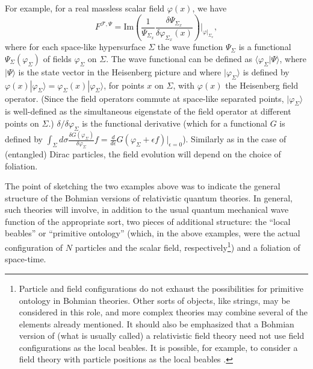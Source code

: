 \documentclass[12pt]{article}
\begin{document}
For example, for a real massless scalar field $\varphi(x)$, we have
\begin{equation}
F^{\mathscr{F},\Psi} = \text{Im} \left( \frac{1}{\Psi_{\Sigma_x}} \frac{\delta \Psi_{\Sigma_x}}{\delta \varphi_{\Sigma_x}(x)} \right)\Big|_{\varphi|_{\Sigma_x}},
\label{f}
\end{equation} 
where for each space-like hypersurface $\Sigma$ the wave function
$\Psi_\Sigma$ is a functional $\Psi_\Sigma(\varphi_\Sigma)$ of fields
$\varphi_\Sigma$ on $\Sigma$. The wave functional can be defined as
$\langle \varphi_\Sigma | \Psi \rangle$, where $|\Psi \rangle$ is the
state vector in the Heisenberg picture and where
$|\varphi_\Sigma\rangle$ is defined by $ \varphi(x)
|\varphi_\Sigma\rangle = \varphi_\Sigma(x) |\varphi_\Sigma\rangle$,
for points $x$ on $\Sigma$, with $\varphi(x)$ the Heisenberg field
operator.  (Since the field operators commute at space-like separated points, $|\varphi_\Sigma\rangle$ is well-defined as the simultaneous eigenstate of the field operator at different points on $\Sigma$.) $\delta /\delta \varphi_\Sigma$ is the functional derivative (which for a functional $G$ is defined by $\int_\Sigma d\sigma \frac{\delta G(\varphi_\Sigma)}{\delta \varphi_\Sigma}f = \frac{d}{d\epsilon} G(\varphi_\Sigma + \epsilon f)\big|_{\epsilon = 0}$). Similarly as in the case of (entangled) Dirac particles, the field evolution will depend on the choice of foliation.

The point of sketching the two examples above was to
indicate the general structure of the Bohmian versions of relativistic
quantum theories.
In general, such theories will involve, in addition to the usual quantum
mechanical wave function of the appropriate sort, two pieces of
additional structure:  the ``local beables'' or ``primitive ontology''
(which, in the above examples, were the actual configuration of $N$
particles and the scalar field, respectively\footnote{Particle and field configurations do not exhaust the possibilities
  for primitive ontology in Bohmian theories.  Other sorts of objects,
  like strings, may be considered in this role, and more complex
  theories  may combine several of the elements
  already mentioned.  It should also be emphasized that a Bohmian
  version of (what is usually called) a relativistic field theory 
  need not use field configurations as the local beables.  It is
  possible, for example, to consider a field theory with particle
  positions as the local beables \cite{duerr04b,colin07}.})
and a foliation of space-time.
\end{document}
